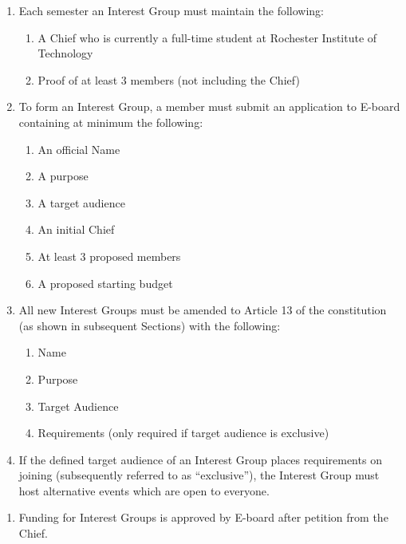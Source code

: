 \begin{enumerate}
	\item Each semester an Interest Group must maintain the following:
	      \begin{enumerate}
		      \item A Chief who is currently a full-time student at Rochester Institute of
		            Technology
		      \item Proof of at least 3 members (not including the Chief)
	      \end{enumerate}
	\item To form an Interest Group, a member must submit an application to E-board
	      containing at minimum the following:
	      \begin{enumerate}
		      \item An official Name
		      \item A purpose
		      \item A target audience
		      \item An initial Chief
		      \item At least 3 proposed members
		      \item A proposed starting budget
	      \end{enumerate}
	\item All new Interest Groups must be amended to Article 13 of the constitution (as
	      shown in subsequent Sections) with the following:
	      \begin{enumerate}
		      \item Name
		      \item Purpose
		      \item Target Audience
		      \item Requirements (only required if target audience is exclusive)
	      \end{enumerate}
	\item If the defined target audience of an Interest Group places requirements on
	      joining (subsequently referred to as ``exclusive''), the Interest Group must
	      host alternative events which are open to everyone.
\end{enumerate}


\begin{enumerate}
	\item Funding for Interest Groups is approved by E-board after petition from the
	      Chief.
\end{enumerate}


% 
% 
% 
% 